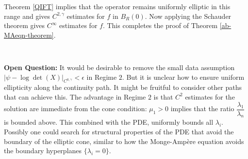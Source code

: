 \documentclass[11pt,letterpaper]{amsart}
\numberwithin{equation}{section}
\begin{document}
\begin{itemize}



Theorem \ref{QIFT} implies that the operator remains uniformly elliptic in this range and gives $C^{2,\gamma}$ estimates for $f$ in $B_R(0)$. Now applying the Schauder theorem gives $C^{\infty}$ estimates for $f$. This completes the proof of Theorem \ref{ab-MAeqn-theorem}. 

\


\vspace{1cm}



{\bf Open Question:} It would be desirable to remove the small data assumption $|\psi - \log \det(X)|_{C^{0,\gamma}} < \epsilon$ in Regime $2$. But it is unclear how to ensure uniform ellipticity along the continuity path. It might be fruitful to consider other paths that can achieve this. The advantage in Regime $2$ is that $C^2$ estimates for the solution are immediate from the cone condition: $\mu_1>0$ implies that the ratio $\dfrac{\lambda_1}{\lambda_n}$ is bounded above. This combined with the PDE, uniformly bounds all $\lambda_i$. Possibly one could search for structural properties of the PDE that avoid the boundary of the elliptic cone, similar to how the Monge-Amp\`ere equation avoids the boundary hyperplanes $\{\lambda_i = 0\}$. 







    
\end{itemize}




\clearpage















\end{document}
